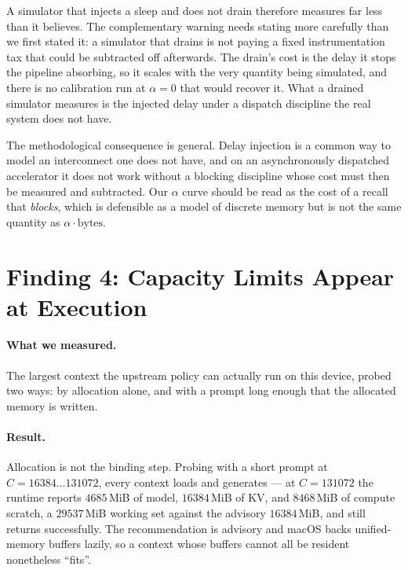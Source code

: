 \documentclass[manuscript,anonymous,review]{acmart}
\begin{document}
A simulator that injects a sleep and does not drain therefore measures
far less than it believes. The complementary warning needs stating more
carefully than we first stated it: a simulator that drains is not
paying a fixed instrumentation tax that could be subtracted off
afterwards. The drain's cost is the delay it stops the pipeline
absorbing, so it scales with the very quantity being simulated, and
there is no calibration run at $\alpha = 0$ that would recover it.
What a drained simulator measures is the injected delay under a
dispatch discipline the real system does not have.

The methodological consequence is general. Delay injection is a common
way to model an interconnect one does not have, and on an
asynchronously dispatched accelerator it does not work without a
blocking discipline whose cost must then be measured and subtracted.
Our $\alpha$ curve should be read as the cost of a recall that
\emph{blocks}, which is defensible as a model of discrete memory but is
not the same quantity as $\alpha \cdot \text{bytes}$.

\section{Finding 4: Capacity Limits Appear at Execution}
\label{sec:f4}

\paragraph{What we measured.} The largest context the upstream policy
can actually run on this device, probed two ways: by allocation alone,
and with a prompt long enough that the allocated memory is written.

\paragraph{Result.} Allocation is not the binding step. Probing with a
short prompt at $C = 16384 \ldots 131072$, every context loads and
generates --- at $C = 131072$ the runtime reports $4685$\,MiB of model,
$16384$\,MiB of KV, and $8468$\,MiB of compute scratch, a $29537$\,MiB
working set against the advisory $16384$\,MiB, and still returns
successfully. The recommendation is advisory and macOS backs
unified-memory buffers lazily, so a context whose buffers cannot all be
resident nonetheless ``fits''.
\end{document}
